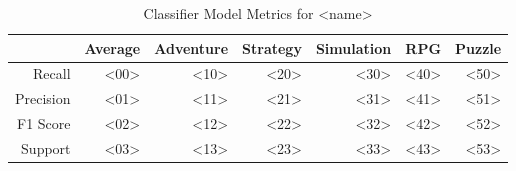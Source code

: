 \begin{table}[h]
    \centering
    \begin{tabular}{r|r|r|r|r|r|r}
        & Average & Adventure & Strategy & Simulation & RPG & Puzzle \\\hline
        Recall      & <00> & <10> & <20> & <30> & <40> & <50>\\
        Precision   & <01> & <11> & <21> & <31> & <41> & <51>\\
        F1 Score    & <02> & <12> & <22> & <32> & <42> & <52>\\
        Support     & <03> & <13> & <23> & <33> & <43> & <53>
\end{tabular}
    \caption{Classifier Model Metrics for <name>}
    \label{tab:model_metrics}
\end{table}